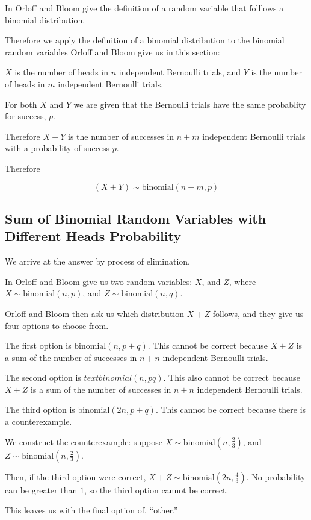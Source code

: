 \documentclass[a4paper,11pt]{article}
\begin{document}
In \cite{reading4} Orloff and Bloom give the definition of a random 
variable that folllows a binomial distribution.

Therefore we apply the definition of a binomial distribution to the
binomial random variables Orloff and Bloom give us in this section:

$X$ is the number of heads in $n$ independent Bernoulli trials, and $Y$
is the number of heads in $m$ independent Bernoulli trials.

For both $X$ and $Y$ we are given that the Bernoulli trials have the
same probablity for success, $p$.

Therefore $X+Y$ is the number of successes in $n+m$ independent
Bernoulli trials with a probability of success $p$.

Therefore 

\begin{equation}
  \left( X + Y \right) \sim \text{binomial} \left( n + m, p \right)
\end{equation}

\subsection{Sum of Binomial Random Variables with Different Heads 
  Probability}

We arrive at the answer by process of elimination. 

In \cite{slides4} Orloff and Bloom give us two random variables: $X$,
and $Z$, where $X \sim \text{binomial} \left( n, p \right)$, and
$Z \sim \text{binomial} \left( n, q \right)$.

Orloff and Bloom then ask us which distribution $X + Z$ follows, and
they give us four options to choose from.  

The first option is $\text{binomial} \left( n, p + q \right)$.  This 
cannot be correct because $X + Z$ is a sum of the number of successes in 
$n + n$ independent Bernoulli trials.

The second option is $text{binomial} \left( n, pq \right)$.  This also
cannot be correct because $X + Z$ is a sum of the number of successes in 
$n + n$ independent Bernoulli trials.

The third option is $\text{binomial} \left( 2n, p + q \right)$.  This
cannot be correct because there is a counterexample.

We construct the counterexample:  suppose 
$X \sim \text{binomial} \left( n, \frac{2}{3} \right)$, and
$Z \sim \text{binomial} \left( n, \frac{2}{3} \right)$.

Then, if the third option were correct, 
$X + Z \sim \text{binomial} \left( 2n, \frac{4}{3} \right)$.  No 
probability can be greater than $1$, so the third option cannot be
correct.

This leaves us with the final option of, ``other.''


 
\printbibliography{}
\end{document}
